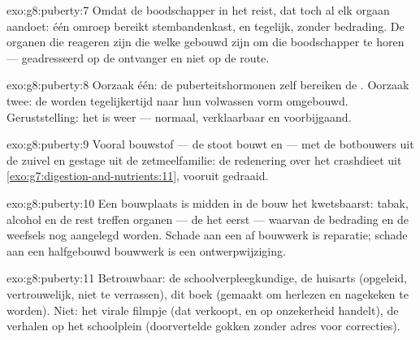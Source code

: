 \begin{solution}{exo:g8:puberty:7}
Omdat de boodschapper in het  reist, dat toch al elk orgaan aandoet:
één omroep bereikt stembandenkast,  en  tegelijk, zonder
bedrading. De organen die reageren zijn die welke gebouwd zijn om die
boodschapper te horen --- geadresseerd op de ontvanger en niet op de route.
\end{solution}

\begin{solution}{exo:g8:puberty:8}
Oorzaak één: de puberteitshormonen zelf bereiken de . Oorzaak
twee: de  worden tegelijkertijd naar hun volwassen vorm omgebouwd.
Geruststelling: het is weer --- normaal, verklaarbaar en voorbijgaand.
\end{solution}

\begin{solution}{exo:g8:puberty:9}
Vooral bouwstof --- de stoot bouwt  en  --- met de botbouwers uit
de zuivel en gestage  uit de zetmeelfamilie: de redenering over het
crashdieet uit \cref{exo:g7:digestion-and-nutrients:11}, vooruit gedraaid.
\end{solution}

\begin{solution}{exo:g8:puberty:10}
Een bouwplaats is midden in de bouw het kwetsbaarst: tabak, alcohol en de
rest treffen organen --- de  het eerst --- waarvan de bedrading en
de weefsels nog aangelegd worden. Schade aan een af bouwwerk is reparatie;
schade aan een halfgebouwd bouwwerk is een ontwerpwijziging.
\end{solution}

\begin{solution}{exo:g8:puberty:11}
Betrouwbaar: de schoolverpleegkundige, de huisarts (opgeleid,
vertrouwelijk, niet te verrassen), dit boek (gemaakt om herlezen en
nagekeken te worden). Niet: het virale filmpje (dat verkoopt, en op
onzekerheid handelt), de verhalen op het schoolplein (doorvertelde gokken
zonder adres voor correcties).
\end{solution}

